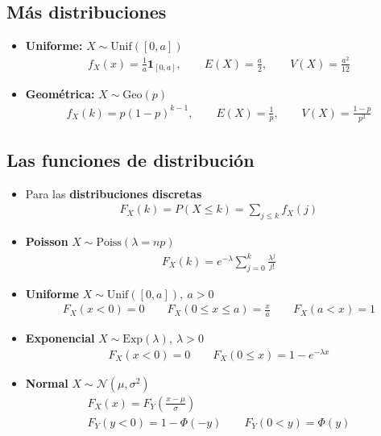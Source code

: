 \documentclass[a4paper,twocolumn]{extarticle}
\theoremstyle{remark}
\newcommand{\normal}{\mathcal{N}}
\begin{document}
\subsection{Más distribuciones}

\begin{itemize}
	\item \textbf{Uniforme:} $X \sim \text{Unif}([0,a])$
	\begin{align*}
		f_X(x) = \frac{1}{a}\mathbf{1}_{[0,a]},\qquad E(X) = \frac{a}{2},\qquad V(X) = \frac{a^2}{12}
	\end{align*}
	\item \textbf{Geométrica:} $X \sim \text{Geo}(p)$
	\begin{align*}
		f_X(k) = p(1-p)^{k-1},\qquad E(X) = \frac{1}{p},\qquad V(X) = \frac{1-p}{p^2}
	\end{align*}
\end{itemize}

\subsection{Las funciones de distribución}
\begin{itemize}
	\item Para las \textbf{distribuciones discretas}
	\begin{align*}
		F_X(k) = P(X \leq k) = \sum_{j \leq k} f_X(j)
	\end{align*}
	\item \textbf{Poisson} $X \sim \text{Poiss}(\lambda = np)$
	\begin{align*}
		F_X(k) = e^{-\lambda}\sum_{j=0}^k \frac{\lambda^j}{j!}
	\end{align*}
	\item \textbf{Uniforme} $X \sim \text{Unif}([0,a]),\ a > 0$
	\begin{align*}
		F_X(x < 0) = 0\qquad F_X(0 \leq x \leq a) = \frac{x}{a} \qquad F_X(a < x) = 1
	\end{align*}
	\item \textbf{Exponencial} $X \sim \text{Exp}(\lambda),\ \lambda > 0$
	\begin{align*}
		F_X(x < 0) = 0 \qquad F_X(0 \leq x) = 1 - e^{-\lambda x}
	\end{align*}
	\item \textbf{Normal} $X \sim \normal(\mu, \sigma^2)$
	\begin{align*}
		F_X(x) = F_Y(\frac{x - \mu}{\sigma}) \\
		F_Y(y < 0) = 1 - \Phi(-y) \qquad F_Y(0 < y) = \Phi(y)
	\end{align*}
\end{itemize}
\end{document}
